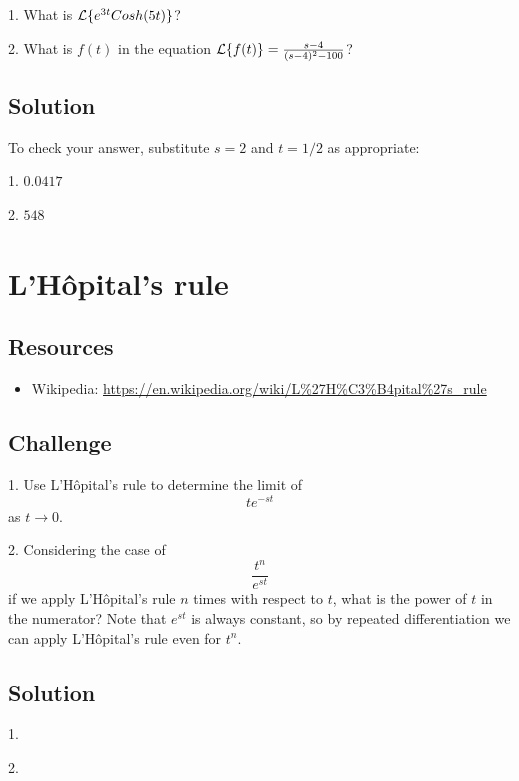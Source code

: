 1. What is $\mathcal{L}\{e^{3t} Cosh(5t)\}$?

2. What is $f(t)$ in the equation $\mathcal{L}\{f(t)\} = \frac{s-4}{(s-4)^2-100}$?

\subsection*{Solution}
To check your answer, substitute $s=2$ and $t=1/2$ as appropriate:

1. $0.0417$

2. $548$




\newpage
\section{L'H\^opital's rule}

\subsection*{Resources}
\begin{itemize}
    \item Wikipedia: \url{https://en.wikipedia.org/wiki/L\%27H\%C3\%B4pital\%27s_rule}
\end{itemize}

\subsection*{Challenge}
1. Use L'H\^opital's rule to determine the limit of
\begin{equation}
    t e^{-st}
\end{equation}
as $t \rightarrow 0$.

2. Considering the case of
\begin{equation}
    \frac{t^n}{e^{st}}
\end{equation}
if we apply L'H\^opital's rule $n$ times with respect to $t$, what is the power of $t$ in the numerator? Note that $e^{st}$ is always constant, so by repeated differentiation we can apply L'H\^opital's rule even for $t^n$.

\subsection*{Solution}
1.\\

2.\\




